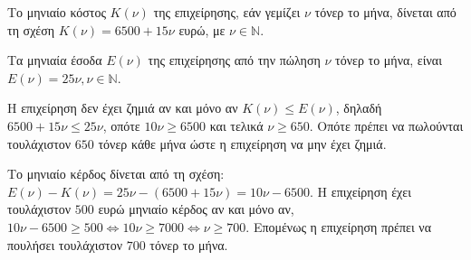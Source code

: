 
\begin{alist}
\item Το μηνιαίο κόστος $K(\nu)$ της επιχείρησης, εάν γεμίζει $\nu$ τόνερ το μήνα, δίνεται από τη
σχέση $K(\nu) = 6500 + 15\nu$ ευρώ, με $\nu \in \mathbb{N}$.

\item Τα μηνιαία έσοδα $E(\nu)$ της επιχείρησης από την πώληση $\nu$ τόνερ το μήνα, είναι
$E(\nu) = 25\nu, \nu \in \mathbb{N}$.

\item 
\begin{rlist}
\item Η επιχείρηση δεν έχει ζημιά αν και μόνο αν $K(\nu) \le E(\nu)$, δηλαδή $6500 + 15\nu \le 25\nu$,
οπότε $10\nu \ge 6500$ και τελικά $\nu \ge 650$. Οπότε πρέπει να πωλούνται τουλάχιστον $650$
τόνερ κάθε μήνα ώστε η επιχείρηση να μην έχει ζημιά.

\item Το μηνιαίο κέρδος δίνεται από τη σχέση:
$E(\nu) - K(\nu) = 25\nu - (6500 + 15\nu) = 10\nu - 6500$. Η επιχείρηση έχει τουλάχιστον $500$ ευρώ
μηνιαίο κέρδος αν και μόνο αν, $10\nu - 6500 \ge 500 \Leftrightarrow 10\nu \ge 7000 \Leftrightarrow \nu \ge 700$. Επομένως η
επιχείρηση πρέπει να πουλήσει τουλάχιστον $700$ τόνερ το μήνα.
\end{rlist}
\end{alist}

